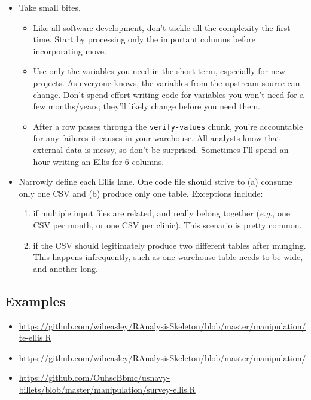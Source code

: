 \documentclass[
]{book}
\providecommand{\tightlist}{%
  \setlength{\itemsep}{0pt}\setlength{\parskip}{0pt}}
\begin{document}
\begin{itemize}
\tightlist
\item
  Take small bites.

  \begin{itemize}
  \tightlist
  \item
    Like all software development, don't tackle all the complexity the first time. Start by processing only the important columns before incorporating move.
  \item
    Use only the variables you need in the short-term, especially for new projects. As everyone knows, the variables from the upstream source can change. Don't spend effort writing code for variables you won't need for a few months/years; they'll likely change before you need them.
  \item
    After a row passes through the \texttt{verify-values} chunk, you're accountable for any failures it causes in your warehouse. All analysts know that external data is messy, so don't be surprised. Sometimes I'll spend an hour writing an Ellis for 6 columns.
  \end{itemize}
\item
  Narrowly define each Ellis lane. One code file should strive to (a) consume only one CSV and (b) produce only one table. Exceptions include:

  \begin{enumerate}
  \def\labelenumi{\arabic{enumi}.}
  \tightlist
  \item
    if multiple input files are related, and really belong together (\emph{e.g.}, one CSV per month, or one CSV per clinic). This scenario is pretty common.
  \item
    if the CSV should legitimately produce two different tables after munging. This happens infrequently, such as one warehouse table needs to be wide, and another long.
  \end{enumerate}
\end{itemize}

\hypertarget{examples}{%
\subsection{Examples}\label{examples}}

\begin{itemize}
\tightlist
\item
  \url{https://github.com/wibeasley/RAnalysisSkeleton/blob/master/manipulation/te-ellis.R}
\item
  \url{https://github.com/wibeasley/RAnalysisSkeleton/blob/master/manipulation/}
\item
  \url{https://github.com/OuhscBbmc/usnavy-billets/blob/master/manipulation/survey-ellis.R}
\end{itemize}
\end{document}
